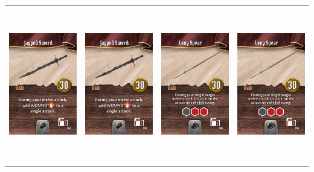\documentclass{minimal}
\begin{document}
{\begin{longtable}{llll}
\includegraphics[width=44mm,height=68mm]{./22-28/gh-025-jagged-sword.png} &
\includegraphics[width=44mm,height=68mm]{./22-28/gh-025-jagged-sword.png} &
\includegraphics[width=44mm,height=68mm]{./22-28/gh-026-long-spear.png} &
\includegraphics[width=44mm,height=68mm]{./22-28/gh-026-long-spear.png}\\ 

\end{longtable}}
\end{document}
